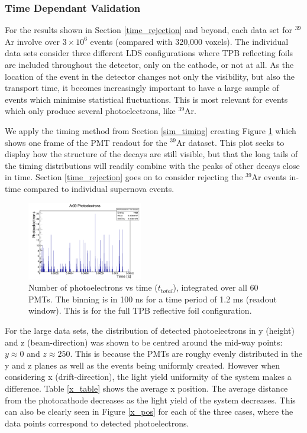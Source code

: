 \documentclass[a4paper]{article}
\begin{document}
\subsubsection{Time Dependant Validation}

For the results shown in Section \ref{time_rejection} and beyond, each data set for $^{39}$Ar involve over $3 \times 10^{6}$ events (compared with 320,000 voxels). The individual data sets consider three different LDS configurations where TPB reflecting foils are included throughout the detector, only on the cathode, or not at all. As the location of the event in the detector changes not only the visibility, but also the transport time, it becomes increasingly important to have a large sample of events which minimise statistical fluctuations. This is most relevant for events which only produce several photoelectrons, like $^{39}$Ar. 

We apply the timing method from Section \ref{sim_timing} creating Figure \ref{pmts_time} which shows one frame of the PMT readout for the $^{39}$Ar dataset. This plot seeks to display how the structure of the decays are still visible, but that the long tails of the timing distributions will readily combine with the peaks of other decays close in time. Section \ref{time_rejection} goes on to consider rejecting the $^{39}$Ar events in-time compared to individual supernova events.

\begin{figure}[H]
\centering
\includegraphics[width=0.45\textwidth]{pmt_times_labels.pdf}
\caption{Number of photoelectrons vs time ($t_{total}$), integrated over all 60 PMTs. The binning is in 100 ns for a time period of 1.2 ms (readout window). This is for the full TPB reflective foil configuration.}\label{pmts_time}
\end{figure}

For the large data sets, the distribution of detected photoelectrons in y (height) and z (beam-direction) was shown to be centred around the mid-way points: $y \approx 0$ and $z \approx 250$. This is because the PMTs are roughy evenly distributed in the y and z planes as well as the events being uniformly created. However when considering x (drift-direction), the light yield uniformity of the system makes a difference. Table \ref{x_table} shows the average x position. The average distance from the photocathode decreases as the light yield of the system decreases. This can also be clearly seen in Figure \ref{x_pos} for each of the three cases, where the data points correspond to detected photoelectrons.
\end{document}
